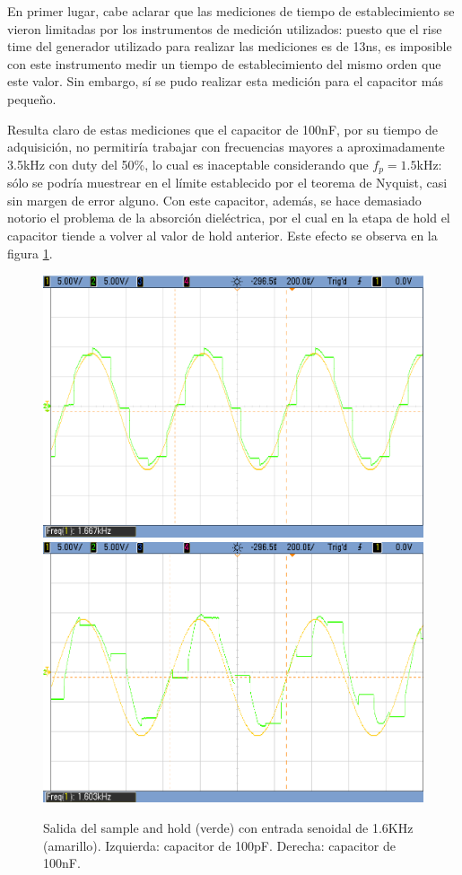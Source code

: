 \documentclass{article}
\begin{document}
En primer lugar, cabe aclarar que las mediciones de tiempo de establecimiento se vieron limitadas por los instrumentos de medici\'on utilizados: puesto que el rise time del generador utilizado para realizar las mediciones es de 13ns, es imposible con este instrumento medir un tiempo de establecimiento del mismo orden que este valor. Sin embargo, s\'i se pudo realizar esta medici\'on para el capacitor m\'as peque\~no.\par

Resulta claro de estas mediciones que el capacitor de 100nF, por su tiempo de adquisici\'on, no permitir\'ia trabajar con frecuencias mayores a aproximadamente 3.5kHz con duty del 50\%, lo cual es inaceptable considerando que $f_p=1.5$kHz: s\'olo se podr\'ia muestrear en el l\'imite establecido por el teorema de Nyquist, casi sin margen de error alguno. Con este capacitor, adem\'as, se hace demasiado notorio el problema de la absorci\'on diel\'ectrica, por el cual en la etapa de hold el capacitor tiende a volver al valor de hold anterior. Este efecto se observa en la figura \ref{fig:1k6}. \par

\begin{figure}[htb]     
	\centering     
	\includegraphics[scale=0.25]{sh/1k6_100p.png}     
	\includegraphics[scale=0.25]{sh/1k6_100n.png}     
	\caption{Salida del sample and hold (verde) con entrada senoidal de 1.6KHz (amarillo). Izquierda: capacitor de 100pF. Derecha: capacitor de 100nF.}     
	\label{fig:1k6} 
\end{figure}
\end{document}
